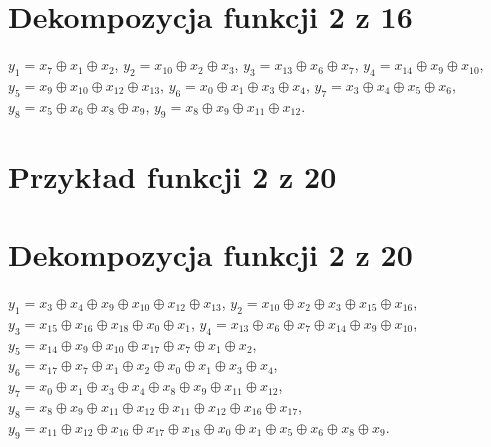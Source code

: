 \section*{Dekompozycja funkcji 2 z 16}
\label{file:2outof16.txt}
\noindent
$y_1 = x_7 \oplus x_1 \oplus x_2$, \newline
$y_2 = x_10 \oplus x_2 \oplus x_3$, \newline
$y_3 = x_13 \oplus x_6 \oplus x_7$, \newline
$y_4 = x_14 \oplus x_9 \oplus x_10$, \newline
$y_5 = x_9 \oplus x_10 \oplus x_12 \oplus x_13$, \newline
$y_6 = x_0 \oplus x_1 \oplus x_3 \oplus x_4$, \newline
$y_7 = x_3 \oplus x_4 \oplus x_5 \oplus x_6$, \newline
$y_8 = x_5 \oplus x_6 \oplus x_8 \oplus x_9$, \newline
$y_9 = x_8 \oplus x_9 \oplus x_11 \oplus x_12$. \newline

\clearpage

\section*{Przykład funkcji 2 z 20}
\label{file:2outof20.pla}

\clearpage

\section*{Dekompozycja funkcji 2 z 20}
\label{file:2outof20.txt}
\noindent
$y_1 = x_3 \oplus x_4 \oplus x_9 \oplus x_10 \oplus x_12 \oplus x_13$, \newline
$y_2 = x_10 \oplus x_2 \oplus x_3 \oplus x_15 \oplus x_16$, \newline
$y_3 = x_15 \oplus x_16 \oplus x_18 \oplus x_0 \oplus x_1$,  \newline
$y_4 = x_13 \oplus x_6 \oplus x_7 \oplus x_14 \oplus x_9 \oplus x_10$,  \newline
$y_5 = x_14 \oplus x_9 \oplus x_10 \oplus x_17 \oplus x_7 \oplus x_1 \oplus x_2$,  \newline
$y_6 = x_17 \oplus x_7 \oplus x_1 \oplus x_2 \oplus x_0 \oplus x_1 \oplus x_3 \oplus x_4$,  \newline
$y_7 = x_0 \oplus x_1 \oplus x_3 \oplus x_4 \oplus x_8 \oplus x_9 \oplus x_11 \oplus x_12$,  \newline
$y_8 = x_8 \oplus x_9 \oplus x_11 \oplus x_12 \oplus x_11 \oplus x_12 \oplus x_16 \oplus x_17$,  \newline
$y_9 = x_11 \oplus x_12 \oplus x_16 \oplus x_17 \oplus x_18 \oplus x_0 \oplus x_1 \oplus x_5 \oplus x_6 \oplus x_8 \oplus x_9$. \newline

\clearpage